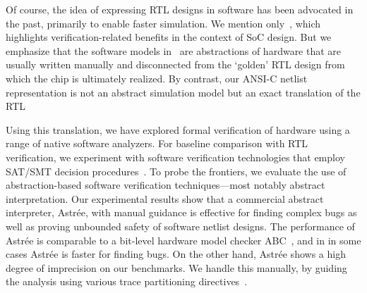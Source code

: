Of course, the idea of expressing RTL designs in software has been  advocated in the past, primarily to enable faster simulation. We mention only~\cite{soc-keating}, which highlights verification-related benefits in the context of SoC design.  But we emphasize that the software models in~\cite{soc-keating} are abstractions of hardware that are usually written manually and disconnected from the `golden' RTL design  from which the chip is ultimately realized.  By contrast, our ANSI-C netlist representation is not an abstract simulation model but an exact translation of the RTL

Using this translation, we have explored formal verification of hardware using a range of 
native software analyzers.  For baseline comparison with RTL verification, we experiment with software verification technologies that employ SAT/SMT decision procedures~\cite{DBLP:conf/cav/BeyerK11,2ls,cbmc.tacas:2004,DBLP:conf/tacas/HeizmannDGLMSP16}. To 
probe the frontiers, we evaluate the use of abstraction-based software verification 
techniques---most notably abstract interpretation. Our experimental results show that a commercial abstract interpreter,  Astr{\'e}e, with manual guidance is effective for finding complex bugs 
as well as proving unbounded safety of software netlist designs. The performance of Astr{\'e}e is 
comparable to a bit-level hardware model checker ABC~\cite{abc}, and in 
in some cases Astr{\'e}e is faster for finding bugs.  On the other hand, 
Astr{\'e}e shows a high degree of imprecision on our benchmarks. We handle this 
manually, by guiding the analysis using various trace 
partitioning directives~\cite{DBLP:journals/toplas/RivalM07}.  

